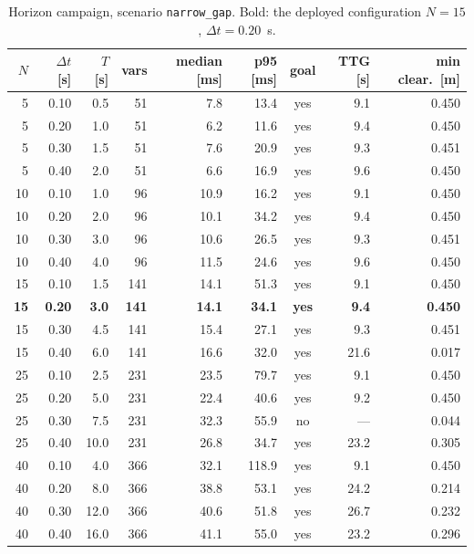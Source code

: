 \begin{table}[htbp]
  \centering
  \small
  \caption{Horizon campaign, scenario \texttt{narrow\_gap}. Bold: the deployed configuration $N=15$, $\Delta t=0.20$~s.}
  \label{res:tab:horizon:narrowgap}
  \begin{tabular}{rrrrrrcrr}
    \toprule
    $N$ & $\Delta t$ [s] & $T$ [s] & vars & median [ms] & p95 [ms] & goal & TTG [s] & min clear.\ [m] \\
    \midrule
    5 & 0.10 & 0.5 & 51 & 7.8 & 13.4 & yes & 9.1 & 0.450 \\
    5 & 0.20 & 1.0 & 51 & 6.2 & 11.6 & yes & 9.4 & 0.450 \\
    5 & 0.30 & 1.5 & 51 & 7.6 & 20.9 & yes & 9.3 & 0.451 \\
    5 & 0.40 & 2.0 & 51 & 6.6 & 16.9 & yes & 9.6 & 0.450 \\
    10 & 0.10 & 1.0 & 96 & 10.9 & 16.2 & yes & 9.1 & 0.450 \\
    10 & 0.20 & 2.0 & 96 & 10.1 & 34.2 & yes & 9.4 & 0.450 \\
    10 & 0.30 & 3.0 & 96 & 10.6 & 26.5 & yes & 9.3 & 0.451 \\
    10 & 0.40 & 4.0 & 96 & 11.5 & 24.6 & yes & 9.6 & 0.450 \\
    15 & 0.10 & 1.5 & 141 & 14.1 & 51.3 & yes & 9.1 & 0.450 \\
    \textbf{15} & \textbf{0.20} & \textbf{3.0} & \textbf{141} & \textbf{14.1} & \textbf{34.1} & \textbf{yes} & \textbf{9.4} & \textbf{0.450} \\
    15 & 0.30 & 4.5 & 141 & 15.4 & 27.1 & yes & 9.3 & 0.451 \\
    15 & 0.40 & 6.0 & 141 & 16.6 & 32.0 & yes & 21.6 & 0.017 \\
    25 & 0.10 & 2.5 & 231 & 23.5 & 79.7 & yes & 9.1 & 0.450 \\
    25 & 0.20 & 5.0 & 231 & 22.4 & 40.6 & yes & 9.2 & 0.450 \\
    25 & 0.30 & 7.5 & 231 & 32.3 & 55.9 & no & --- & 0.044 \\
    25 & 0.40 & 10.0 & 231 & 26.8 & 34.7 & yes & 23.2 & 0.305 \\
    40 & 0.10 & 4.0 & 366 & 32.1 & 118.9 & yes & 9.1 & 0.450 \\
    40 & 0.20 & 8.0 & 366 & 38.8 & 53.1 & yes & 24.2 & 0.214 \\
    40 & 0.30 & 12.0 & 366 & 40.6 & 51.8 & yes & 26.7 & 0.232 \\
    40 & 0.40 & 16.0 & 366 & 41.1 & 55.0 & yes & 23.2 & 0.296 \\
    \bottomrule
  \end{tabular}
\end{table}

